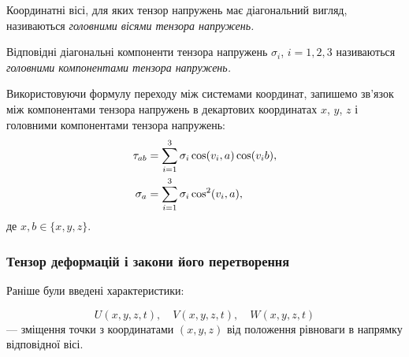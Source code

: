 \begin{definition}
	Координатні вісі, для яких тензор напружень має діагональний вигляд, називаються \it{головними вісями тензора напружень}.
\end{definition}

\begin{definition}
	Відповідні діагональні компоненти тензора напружень $\sigma_i$, $i = 1,2,3$ називаються \it{головними компонентами тензора напружень}. 
\end{definition}

Використовуючи формулу переходу між системами координат, запишемо зв'язок між компонентами тензора напружень в декартових координатах $x$, $y$, $z$ і головними компонентами тензора напружень:
\begin{align}
	\tau_{a b} &= \displaystyle\sum\limits_{i = 1}^3 \sigma_i \cos(v_i, a) \cos (v_i b), \\
	\sigma_a &= \displaystyle\sum\limits_{i = 1}^3 \sigma_i \cos^2(v_i, a),
\end{align}
де $x, b \in \{x, y, z\}$.

\subsubsection{Тензор деформацій і закони його перетворення}

Раніше були введені характеристики:

\begin{equation}
	U(x, y, z, t), \quad V(x, y, z, t), \quad W(x, y, z, t)
\end{equation}
--- зміщення точки з координатами $(x, y, z)$ від положення рівноваги в напрямку відповідної вісі. \medskip


